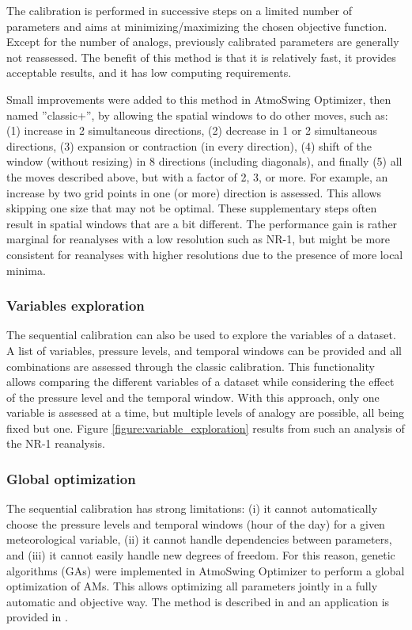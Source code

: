 \documentclass[review]{elsarticle}
\begin{document}
The calibration is performed in successive steps on a limited number of parameters and aims at minimizing/maximizing the chosen objective function. Except for the number of analogs, previously calibrated parameters are generally not reassessed. The benefit of this method is that it is relatively fast, it provides acceptable results, and it has low computing requirements. 

Small improvements were added to this method in AtmoSwing Optimizer, then named ''classic+'', by allowing the spatial windows to do other moves, such as: (1) increase in 2 simultaneous directions, (2) decrease in 1 or 2 simultaneous directions, (3) expansion or contraction (in every direction), (4) shift of the window (without resizing) in 8 directions (including diagonals), and finally (5) all the moves described above, but with a factor of 2, 3, or more. For example, an increase by two grid points in one (or more) direction is assessed. This allows skipping one size that may not be optimal. These supplementary steps often result in spatial windows that are a bit different. The performance gain is rather marginal for reanalyses with a low resolution such as NR-1, but might be more consistent for reanalyses with higher resolutions due to the presence of more local minima.


\subsubsection{Variables exploration}
\label{sec:vars-explo}

The sequential calibration can also be used to explore the variables of a dataset. A list of variables, pressure levels, and temporal windows can be provided and all combinations are assessed through the classic calibration. This functionality allows comparing the different variables of a dataset while considering the effect of the pressure level and the temporal window. With this approach, only one variable is assessed at a time, but multiple levels of analogy are possible, all being fixed but one. Figure \ref{figure:variable_exploration} results from such an analysis of the NR-1 reanalysis. 


\subsubsection{Global optimization}
\label{sec:global-optimization}

The sequential calibration has strong limitations: (i) it cannot automatically choose the pressure levels and temporal windows (hour of the day) for a given meteorological variable, (ii) it cannot handle dependencies between parameters, and (iii) it cannot easily handle new degrees of freedom. For this reason, genetic algorithms (GAs) were implemented in AtmoSwing Optimizer to perform a global optimization of AMs. This allows optimizing all parameters jointly in a fully automatic and objective way. The method is described in \citet{Horton2017a} and an application is provided in \citet{Horton2018a}.
\end{document}
